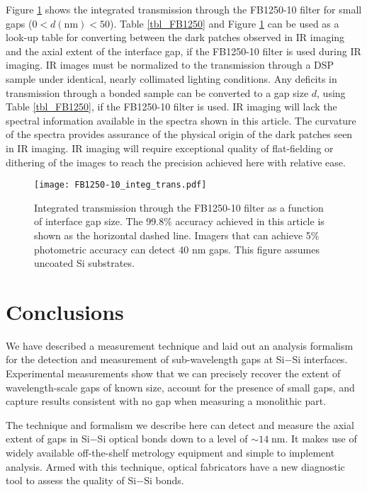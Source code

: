 \documentclass[osajnl,twocolumn,showpacs,superscriptaddress,11pt]{revtex4-1} %
\begin{document}
Figure \ref{figFB1250-10_integ} shows the integrated transmission through the FB1250-10 filter for small gaps ($0 < d(\mathrm{nm}) < 50$).  Table \ref{tbl_FB1250} and Figure \ref{figFB1250-10_integ} can be used as a look-up table for converting between the dark patches observed in IR imaging and the axial extent of the interface gap, if the FB1250-10 filter is used during IR imaging.  IR images must be normalized to the transmission through a DSP sample under identical, nearly collimated lighting conditions.  Any deficits in transmission through a bonded sample can be converted to a gap size $d$, using Table \ref{tbl_FB1250}, if the FB1250-10 filter is used.  IR imaging will lack the spectral information available in the spectra shown in this article.  The curvature of the spectra provides assurance of the physical origin of the dark patches seen in IR imaging.  IR imaging will require exceptional quality of flat-fielding or dithering of the images to reach the precision achieved here with relative ease.  

\begin{figure}[htbp]
\texttt{[image: FB1250-10\_integ\_trans.pdf]}
\caption{\label{figFB1250-10_integ} Integrated transmission through the FB1250-10 filter as a function of interface gap size.  The 99.8\% accuracy achieved in this article is shown as the horizontal dashed line.  Imagers that can achieve 5\% photometric accuracy can detect 40 nm gaps.  This figure assumes uncoated Si substrates.}
\end{figure}

\section{Conclusions}
We have described a measurement technique and laid out an analysis formalism for the detection and measurement of sub-wavelength gaps at Si$-$Si interfaces.  Experimental measurements show that we can precisely recover the extent of wavelength-scale gaps of known size, account for the presence of small gaps, and capture results consistent with no gap when measuring a monolithic part.

The technique and formalism we describe here can detect and measure the axial extent of gaps in Si$-$Si optical bonds down to a level of $\sim14\;$nm.  It makes use of widely available off-the-shelf metrology equipment and simple to implement analysis.  Armed with this technique, optical fabricators have a new diagnostic tool to assess the quality of Si$-$Si bonds.
\end{document}
